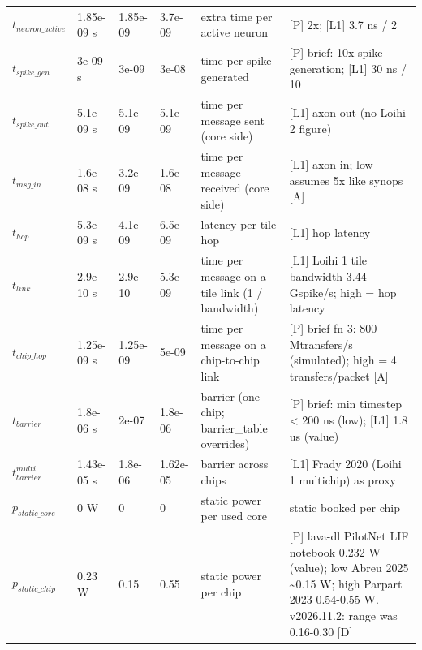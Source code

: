 \begin{tabular}{@{}llllll@{}}
$t_{neuron\_active}$ & 1.85e-09 s & 1.85e-09 & 3.7e-09 & extra time per active neuron & [P] 2x; [L1] 3.7 ns / 2 \\
$t_{spike\_gen}$ & 3e-09 s & 3e-09 & 3e-08 & time per spike generated & [P] brief: 10x spike generation; [L1] 30 ns / 10 \\
$t_{spike\_out}$ & 5.1e-09 s & 5.1e-09 & 5.1e-09 & time per message sent (core side) & [L1] axon out (no Loihi 2 figure) \\
$t_{msg\_in}$ & 1.6e-08 s & 3.2e-09 & 1.6e-08 & time per message received (core side) & [L1] axon in; low assumes 5x like synops [A] \\
$t_{hop}$ & 5.3e-09 s & 4.1e-09 & 6.5e-09 & latency per tile hop & [L1] hop latency \\
$t_{link}$ & 2.9e-10 s & 2.9e-10 & 5.3e-09 & time per message on a tile link (1 / bandwidth) & [L1] Loihi 1 tile bandwidth 3.44 Gspike/s; high = hop latency \\
$t_{chip\_hop}$ & 1.25e-09 s & 1.25e-09 & 5e-09 & time per message on a chip-to-chip link & [P] brief fn 3: 800 Mtransfers/s (simulated); high = 4 transfers/packet [A] \\
$t_{barrier}$ & 1.8e-06 s & 2e-07 & 1.8e-06 & barrier (one chip; barrier\_table overrides) & [P] brief: min timestep \textless{} 200 ns (low); [L1] 1.8 us (value) \\
$t_{barrier}^{multi}$ & 1.43e-05 s & 1.8e-06 & 1.62e-05 & barrier across chips & [L1] Frady 2020 (Loihi 1 multichip) as proxy \\
$p_{static\_core}$ & 0 W & 0 & 0 & static power per used core & static booked per chip \\
$p_{static\_chip}$ & 0.23 W & 0.15 & 0.55 & static power per chip & [P] lava-dl PilotNet LIF notebook 0.232 W (value); low Abreu 2025 \textasciitilde{}0.15 W; high Parpart 2023 0.54-0.55 W. v2026.11.2: range was 0.16-0.30 [D] \\
\bottomrule
\end{tabular}
